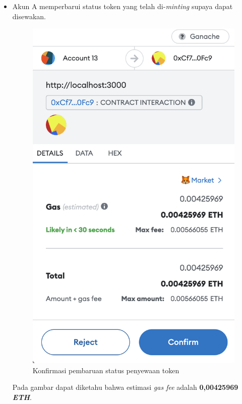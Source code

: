 \begin{itemize}
      \item Akun A memperbarui status token yang telah di-\emph{minting} supaya dapat disewakan.
      \begin{figure} [H] \centering
          \includegraphics[scale=0.3]{gambar/img-test-share-put-item-for-rent-1.png}
          \caption{Konfirmasi pembaruan status penyewaan token}
          \label{fig:TestShareKonfirmasiPembaruanPenyewa}
        \end{figure}
        Pada gambar dapat diketahu bahwa estimasi \emph{gas fee} adalah \textbf{0,00425969 \emph{ETH}}.
        \begin{figure} [H] \centering

\end{figure}
\end{itemize}
